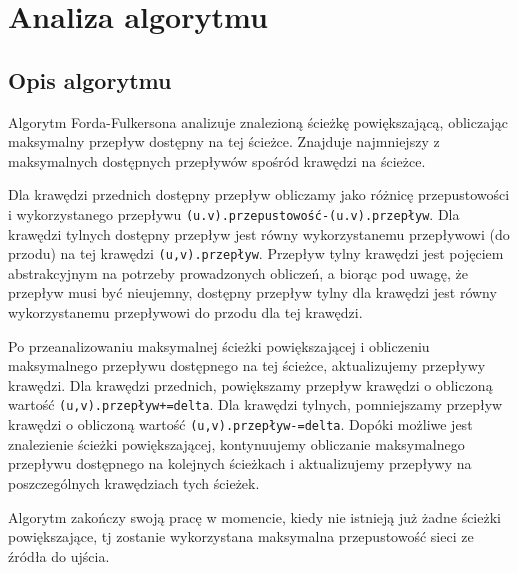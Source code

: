 \documentclass[10pt]{dokument-tiwo}
\begin{document}
\section{Analiza algorytmu}
\label{sec:analiza}

\subsection{Opis algorytmu}
Algorytm Forda-Fulkersona analizuje znalezioną ścieżkę powiększającą, obliczając
maksymalny przepływ dostępny na tej ścieżce. Znajduje najmniejszy z maksymalnych
dostępnych przepływów spośród krawędzi na ścieżce.

Dla krawędzi przednich dostępny przepływ obliczamy jako różnicę przepustowości i
wykorzystanego przepływu \texttt{(u.v).przepustowość-(u.v).przepływ}. Dla
krawędzi tylnych dostępny przepływ jest równy wykorzystanemu przepływowi (do
przodu) na tej krawędzi \texttt{(u,v).przepływ}. Przepływ tylny krawędzi jest
pojęciem abstrakcyjnym na potrzeby prowadzonych obliczeń, a biorąc pod uwagę, że
przepływ musi być nieujemny, dostępny przepływ tylny dla krawędzi jest równy
wykorzystanemu przepływowi do przodu dla tej krawędzi.

Po przeanalizowaniu maksymalnej ścieżki powiększającej i obliczeniu maksymalnego
przepływu dostępnego na tej ścieżce, aktualizujemy przepływy krawędzi. Dla
krawędzi przednich, powiększamy przepływ krawędzi o obliczoną wartość
\texttt{(u,v).przepływ+=delta}. Dla krawędzi tylnych, pomniejszamy przepływ
krawędzi o obliczoną wartość \texttt{(u,v).przepływ-=delta}. Dopóki możliwe jest
znalezienie ścieżki powiększającej, kontynuujemy obliczanie maksymalnego
przepływu dostępnego na kolejnych ścieżkach i aktualizujemy przepływy na
poszczególnych krawędziach tych ścieżek.

Algorytm zakończy swoją pracę w momencie, kiedy nie istnieją już żadne ścieżki
powiększające, tj zostanie wykorzystana maksymalna przepustowość sieci ze źródła
do ujścia.
\end{document}
